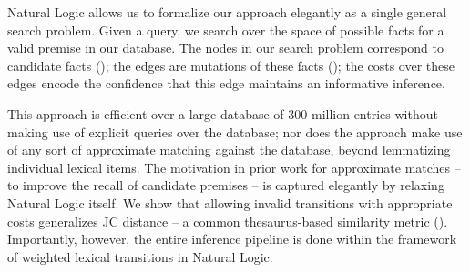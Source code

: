 

Natural Logic allows us to formalize our approach elegantly as
  a single general search problem.
Given a query, we search over the space of possible facts for
  a valid premise in our database.
The nodes in our search problem correspond to candidate facts
  ();
  the edges are mutations of these facts (); 
  the costs over these edges encode the confidence that this edge
  maintains an informative inference.

This approach is efficient over a large database of 300 million entries
  without making use of explicit queries over the database;
  nor does the approach make use of any sort of approximate
  matching against the database, beyond lemmatizing individual 
  lexical items.
The motivation in prior work for approximate matches --
  to improve the recall of candidate premises -- is captured
  elegantly by relaxing Natural Logic itself.
We show that allowing invalid transitions with appropriate costs
  generalizes JC distance \cite{key:1997jc-similarity} -- a common
  thesaurus-based similarity metric ().
Importantly, however, the entire inference pipeline is done
  within the framework of weighted lexical transitions in Natural
  Logic.


